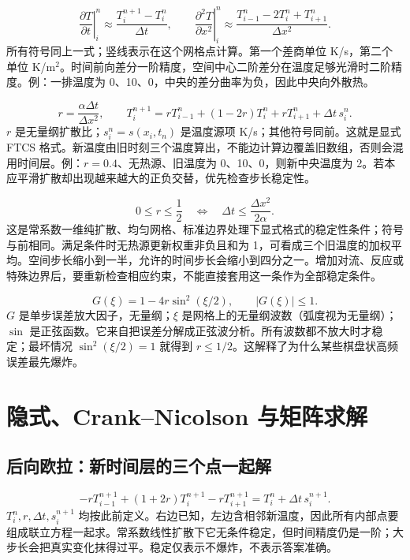 \documentclass[UTF8,zihao=-4,openany,oneside,fontset=windows]{ctexbook}
\begin{document}
\begin{equation}
\left.\frac{\partial T}{\partial t}\right|_i^n\approx\frac{T_i^{n+1}-T_i^n}{\Delta t},\qquad
\left.\frac{\partial^2T}{\partial x^2}\right|_i^n\approx\frac{T_{i-1}^n-2T_i^n+T_{i+1}^n}{\Delta x^2}.
\end{equation}
所有符号同上一式；竖线表示在这个网格点计算。第一个差商单位 K/s，第二个单位 K/m$^2$。时间前向差分一阶精度，空间中心二阶差分在温度足够光滑时二阶精度。例：一排温度为 0、10、0，中央的差分曲率为负，因此中央向外散热。

\begin{equation}
r=\frac{\alpha\Delta t}{\Delta x^2},\qquad
T_i^{n+1}=rT_{i-1}^n+(1-2r)T_i^n+rT_{i+1}^n+\Delta t\,s_i^n.
\end{equation}
$r$ 是无量纲扩散比；$s_i^n=s(x_i,t_n)$ 是温度源项 K/s；其他符号同前。这就是显式 FTCS 格式。新温度由旧时刻三个温度算出，不能边计算边覆盖旧数组，否则会混用时间层。例：$r=0.4$、无热源、旧温度为 0、10、0，则新中央温度为 2。若本应平滑扩散却出现越来越大的正负交替，优先检查步长稳定性。

\begin{equation}
0\leq r\leq\frac12\quad\Longleftrightarrow\quad
\Delta t\leq\frac{\Delta x^2}{2\alpha}.
\end{equation}
这是常系数一维纯扩散、均匀网格、标准边界处理下显式格式的稳定性条件；符号与前相同。满足条件时无热源更新权重非负且和为 1，可看成三个旧温度的加权平均。空间步长缩小到一半，允许的时间步长会缩小到四分之一。增加对流、反应或特殊边界后，要重新检查相应约束，不能直接套用这一条作为全部稳定条件。

\begin{equation}
G(\xi)=1-4r\sin^2(\xi/2),\qquad |G(\xi)|\leq1.
\end{equation}
$G$ 是单步误差放大因子，无量纲；$\xi$ 是网格上的无量纲波数（弧度视为无量纲）；$\sin$ 是正弦函数。它来自把误差分解成正弦波分析。所有波数都不放大时才稳定；最坏情况 $\sin^2(\xi/2)=1$ 就得到 $r\leq1/2$。这解释了为什么某些棋盘状高频误差最先爆炸。

\section{隐式、Crank--Nicolson 与矩阵求解}
\subsection{后向欧拉：新时间层的三个点一起解}
\begin{equation}
-rT_{i-1}^{n+1}+(1+2r)T_i^{n+1}-rT_{i+1}^{n+1}
=T_i^n+\Delta t\,s_i^{n+1}.
\end{equation}
$T_i^n,r,\Delta t,s_i^{n+1}$ 均按此前定义。右边已知，左边含相邻新温度，因此所有内部点要组成联立方程一起求。常系数线性扩散下它无条件稳定，但时间精度仍是一阶；大步长会把真实变化抹得过平。稳定仅表示不爆炸，不表示答案准确。
\end{document}

